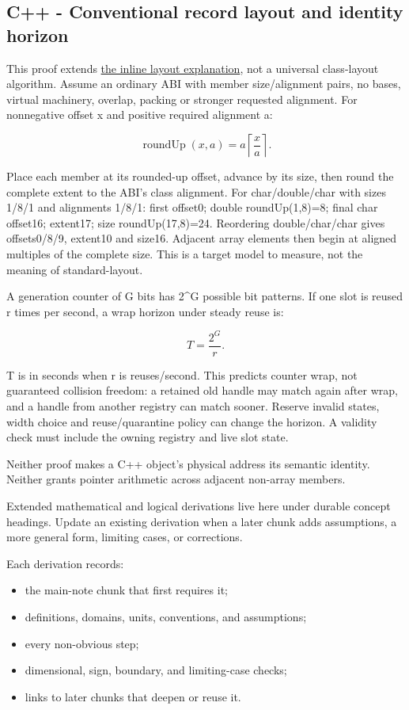 \subsection{C++ - Conventional record layout and identity horizon}\label{c---conventional-record-layout-and-identity-horizon}

This proof extends \hyperref[01-foundations-i-ch003]{the inline layout explanation}, not a universal class-layout algorithm. Assume an ordinary ABI with member size/alignment pairs, no bases, virtual machinery, overlap, packing or stronger requested alignment. For nonnegative offset x and positive required alignment a:

\[
\operatorname{roundUp}(x,a)=a\left\lceil\frac{x}{a}\right\rceil.
\]

Place each member at its rounded-up offset, advance by its size, then round the complete extent to the ABI's class alignment. For char/double/char with sizes 1/8/1 and alignments 1/8/1: first offset0; double roundUp(1,8)=8; final char offset16; extent17; size roundUp(17,8)=24. Reordering double/char/char gives offsets0/8/9, extent10 and size16. Adjacent array elements then begin at aligned multiples of the complete size. This is a target model to measure, not the meaning of standard-layout.

A generation counter of G bits has 2\^{}G possible bit patterns. If one slot is reused r times per second, a wrap horizon under steady reuse is:

\[
T=\frac{2^G}{r}.
\]

T is in seconds when r is reuses/second. This predicts counter wrap, not guaranteed collision freedom: a retained old handle may match again after wrap, and a handle from another registry can match sooner. Reserve invalid states, width choice and reuse/quarantine policy can change the horizon. A validity check must include the owning registry and live slot state.

Neither proof makes a C++ object's physical address its semantic identity. Neither grants pointer arithmetic across adjacent non-array members.

Extended mathematical and logical derivations live here under durable concept headings. Update an existing derivation when a later chunk adds assumptions, a more general form, limiting cases, or corrections.

Each derivation records:

\begin{itemize}
\tightlist
\item
  the main-note chunk that first requires it;
\item
  definitions, domains, units, conventions, and assumptions;
\item
  every non-obvious step;
\item
  dimensional, sign, boundary, and limiting-case checks;
\item
  links to later chunks that deepen or reuse it.
\end{itemize}

